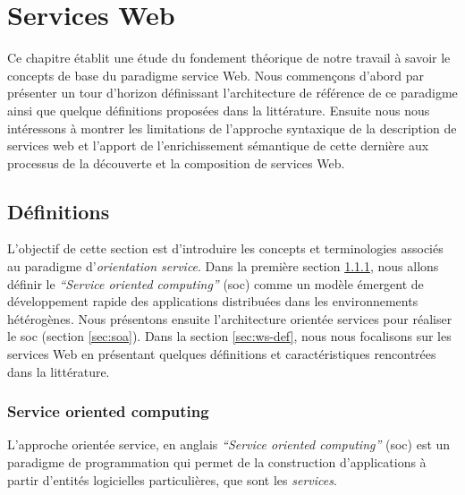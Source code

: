 \chapter{Services Web}
\label{ch:web-service}

Ce chapitre établit une étude du fondement théorique de notre travail
à savoir le  concepts de base du paradigme service Web.  Nous
commençons d'abord par présenter un tour d'horizon définissant
l'architecture de référence de ce paradigme ainsi que quelque
définitions proposées dans la littérature. Ensuite nous nous
intéressons à montrer les limitations de l'approche syntaxique de la
description de services web et l'apport de l'enrichissement sémantique
de cette dernière aux processus de la découverte et la composition de
services Web.


\newpage
\section{Définitions}
\label{sec:ws-definitions}
L'objectif de cette section est d'introduire les concepts et
terminologies associés au paradigme d'\textit{orientation
  service}. Dans la première section \ref{sec:soc}, nous allons
définir le \textit{``Service oriented computing''} (\acrshort{soc})
comme un modèle émergent de développement rapide des applications
distribuées dans les environnements hétérogènes. Nous présentons
ensuite l'architecture orientée services pour réaliser le
\acrshort{soc} (section \ref{sec:soa}). Dans la section
\ref{sec:ws-def}, nous nous focalisons sur les services Web en
présentant quelques définitions et caractéristiques rencontrées dans
la littérature.

  \subsection{Service oriented computing}
  \label{sec:soc}
  L'approche orientée service, en anglais \textit{``Service oriented
    computing''} (\acrshort{soc}) est un paradigme de programmation
  qui permet de la construction d'applications à partir d'entités
  logicielles particulières, que sont les \emph{services}.\bigskip

